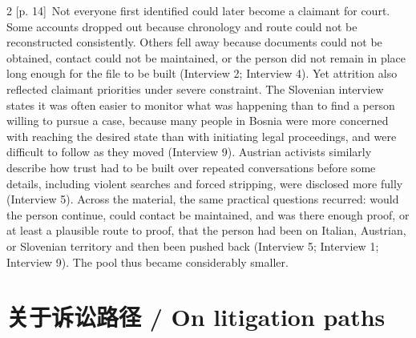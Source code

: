 \documentclass[10pt,a4paper]{article}
\begin{document}
\begin{paracol}{2}
{\scriptsize\color{gray} [p. 14]}\ Not everyone first identified could later become a claimant for court. Some accounts dropped out because chronology and route could not be reconstructed consistently. Others fell away because documents could not be obtained, contact could not be maintained, or the person did not remain in place long enough for the file to be built (Interview 2; Interview 4). Yet attrition also reflected claimant priorities under severe constraint. The Slovenian interview states it was often easier to monitor what was happening than to find a person willing to pursue a case, because many people in Bosnia were more concerned with reaching the desired state than with initiating legal proceedings, and were difficult to follow as they moved (Interview 9). Austrian activists similarly describe how trust had to be built over repeated conversations before some details, including violent searches and forced stripping, were disclosed more fully (Interview 5). Across the material, the same practical questions recurred: would the person continue, could contact be maintained, and was there enough proof, or at least a plausible route to proof, that the person had been on Italian, Austrian, or Slovenian territory and then been pushed back (Interview 5; Interview 1; Interview 9). The pool thus became considerably smaller.\par
\switchcolumn*
\end{paracol}
\section*{关于诉讼路径 / On litigation paths}
\end{document}
